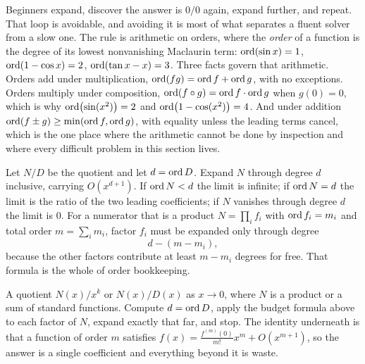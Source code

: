 Beginners expand, discover the answer is $0/0$ again, expand further, and repeat. That loop is avoidable, and avoiding it is most of what separates a fluent solver from a slow one. The rule is arithmetic on orders, where the \emph{order} of a function is the degree of its lowest nonvanishing Maclaurin term: $\operatorname{ord}(\sin x)=1$, $\operatorname{ord}(1-\cos x)=2$, $\operatorname{ord}(\tan x-x)=3$. Three facts govern that arithmetic. Orders add under multiplication, $\operatorname{ord}(fg)=\operatorname{ord} f+\operatorname{ord} g$, with no exceptions. Orders multiply under composition, $\operatorname{ord}(f\circ g)=\operatorname{ord} f\cdot\operatorname{ord} g$ when $g(0)=0$, which is why $\operatorname{ord}\bigl(\sin(x^{2})\bigr)=2$ and $\operatorname{ord}\bigl(1-\cos(x^{2})\bigr)=4$. And under addition $\operatorname{ord}(f\pm g)\geq\min(\operatorname{ord} f,\operatorname{ord} g)$, with equality unless the leading terms cancel, which is the one place where the arithmetic cannot be done by inspection and where every difficult problem in this section lives.

\begin{keynote}
Let $N/D$ be the quotient and let $d=\operatorname{ord} D$. Expand $N$ through degree $d$ inclusive, carrying $O(x^{d+1})$. If $\operatorname{ord} N<d$ the limit is infinite; if $\operatorname{ord} N=d$ the limit is the ratio of the two leading coefficients; if $N$ vanishes through degree $d$ the limit is $0$. For a numerator that is a product $N=\prod_i f_i$ with $\operatorname{ord} f_i=m_i$ and total order $m=\sum_i m_i$, factor $f_i$ must be expanded only through degree
\[
d-(m-m_i),
\]
because the other factors contribute at least $m-m_i$ degrees for free. That formula is the whole of order bookkeeping.
\end{keynote}

\cue A quotient $N(x)/x^{k}$ or $N(x)/D(x)$ as $x\to0$, where $N$ is a product or a sum of standard functions.
\method Compute $d=\operatorname{ord} D$, apply the budget formula above to each factor of $N$, expand exactly that far, and stop. The identity underneath is that a function of order $m$ satisfies $f(x)=\frac{f^{(m)}(0)}{m!}x^{m}+O(x^{m+1})$, so the answer is a single coefficient and everything beyond it is waste.

